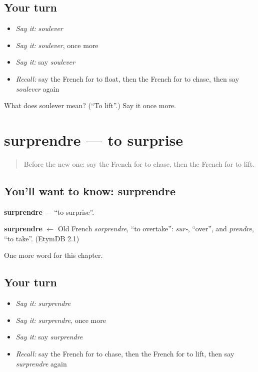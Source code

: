 \subsection*{Your turn}
\begin{itemize}
\raggedright
  \item \emph{Say it:} \emph{soulever}
  \item \emph{Say it:} \emph{soulever}, once more
  \item \emph{Say it:} say \emph{soulever}
  \item \emph{Recall:} say the French for to float, then the French for to chase, then say \emph{soulever} again
\end{itemize}

\begin{tcolorbox}[breakable,colback=teal!4,colframe=teal!35!black,title={Before you move on}]
What does soulever mean? (\textquotedblleft{}To lift\textquotedblright{}.) Say it once more.
\end{tcolorbox}
\section[surprendre]{surprendre — to surprise}

\label{lesson:FR-C213-surprendre}



\begin{quote}
Before the new one: say the French for to chase, then the French for to lift.
\end{quote}

\subsection*{You'll want to know: surprendre}
\textbf{surprendre} — \textquotedblleft{}to surprise\textquotedblright{}.

\begin{cousinweb}
\textbf{surprendre} $\leftarrow$ Old French \emph{sorprendre}, \textquotedblleft{}to overtake\textquotedblright{}: \emph{sur-}, \textquotedblleft{}over\textquotedblright{}, and \emph{prendre}, \textquotedblleft{}to take\textquotedblright{}. (EtymDB 2.1)
\end{cousinweb}

\begin{grammarlens}[title={What you've built}]
One more word for this chapter.
\end{grammarlens}

\subsection*{Your turn}
\begin{itemize}
\raggedright
  \item \emph{Say it:} \emph{surprendre}
  \item \emph{Say it:} \emph{surprendre}, once more
  \item \emph{Say it:} say \emph{surprendre}
  \item \emph{Recall:} say the French for to chase, then the French for to lift, then say \emph{surprendre} again
\end{itemize}

